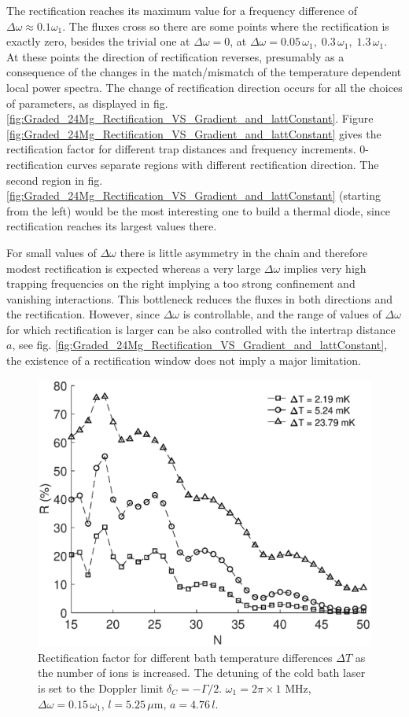 The rectification reaches its maximum value for a frequency difference of $\Delta\omega \approx 0.1 \omega_1$. The fluxes cross so there are some points where the rectification is exactly zero, besides the trivial one at $\Delta\omega = 0$, at $\Delta\omega = 0.05\,\omega_1,\;0.3\,\omega_1,\;1.3\,\omega_1$. At these points the direction of rectification reverses, presumably as a consequence of the changes in the match/mismatch of the temperature dependent local power spectra.
The change of rectification direction occurs for all the choices of parameters, as displayed in fig. \ref{fig:Graded_24Mg_Rectification_VS_Gradient_and_lattConstant}. Figure \ref{fig:Graded_24Mg_Rectification_VS_Gradient_and_lattConstant} gives the rectification factor for different trap distances and frequency increments.  $0$-rectification curves separate regions with different rectification direction. The second region in fig. \ref{fig:Graded_24Mg_Rectification_VS_Gradient_and_lattConstant} (starting from the left) would be the most interesting one to build a thermal diode, since rectification reaches its largest values there.

{For small values of $\Delta \omega$ there is little asymmetry in the chain and therefore modest rectification is expected whereas a very large $\Delta \omega$ implies very high trapping frequencies on the right implying a too strong confinement and vanishing interactions. This bottleneck reduces the fluxes in both directions and  the rectification. However, since $\Delta \omega$ is controllable,
and the range of values of $\Delta \omega$ for which rectification is larger can be also controlled with the intertrap distance $a$, see fig. \ref{fig:Graded_24Mg_Rectification_VS_Gradient_and_lattConstant},
the existence of a rectification window
does not imply a major limitation.}

\begin{figure}
  \center
  \includegraphics[width=0.75\linewidth]{Figures/Changing_N.eps}
  \caption{Rectification factor for different bath temperature differences $\Delta T$ as the number of ions is increased. The detuning of the cold bath laser is set to the Doppler limit $\delta_C = - \Gamma / 2$. $\omega_1 = 2 \pi \times 1$ MHz, $\Delta \omega = 0.15 \, \omega_1$, $l = 5.25\,\mu$m, $a = 4.76 \, l$.}
  \label{fig:N_Dependence}
\end{figure}
%
%
